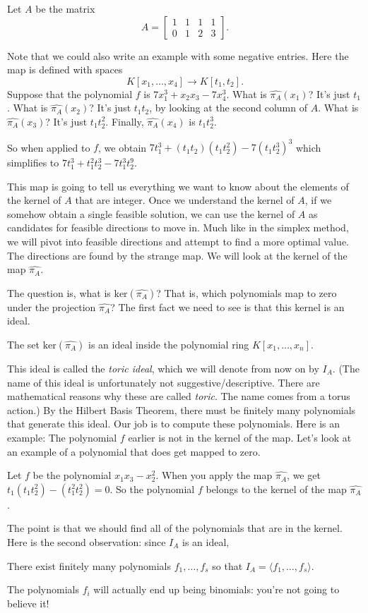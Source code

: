 \begin{example}
Let $A$ be the matrix
\[ A = \left[
\begin{array}{cccc}
1 & 1& 1& 1\\ 0 & 1& 2& 3
\end{array}
\right].\]

Note that we could also write an example with some negative entries. Here the map is defined with spaces
\[ K[x_1,\ldots,x_4] \rightarrow K[t_1,t_2]. \]
Suppose that the polynomial $f$ is $7 x_1^3 + x_2 x_3 - 7 x_4^3$.
What is $\widehat{\pi_A}(x_1)$? It's just $t_1$.
What is $\widehat{\pi_A}(x_2)$? It's just $t_1t_2$, by looking at the second column of $A$.
What is $\widehat{\pi_A}(x_3)$? It's just $t_1t_2^2$.
Finally, $\widehat{\pi_A}(x_4)$ is $t_1t_2^3$.

So when applied to $f$, we obtain $7 t_1^3 + (t_1t_2)(t_1t_2^2) - 7(t_1t_2^3)^3$ which simplifies to $7 t_1^3 + t_1^2 t_2^3 - 7 t_1^3 t_2^9$.
\end{example}
This map is going to tell us everything we want to know about the elements of the kernel of $A$ that are integer. Once we understand the kernel of $A$, if we somehow obtain a single feasible solution, we can use the kernel of $A$ as candidates for feasible directions to move in.  Much like in the simplex method, we will pivot into feasible directions and attempt to find a more optimal value. The directions are found by the strange map. We will look at the kernel of the map $\widehat{\pi_A}$.

The question is, what is $\text{ker}(\widehat{\pi_A})$? That is, which polynomials map to zero under the projection $\widehat{\pi_A}$? The first fact we need to see is that this kernel is an ideal.
\begin{lemma}
The set $\text{ker}(\widehat{\pi_A})$ is an ideal inside the polynomial ring $K[x_1,\ldots,x_n]$.
\end{lemma}
This ideal is called the \textit{toric ideal}, which we will denote from now on by $I_A$. (The name of this ideal is unfortunately not suggestive/descriptive. There are mathematical reasons why these are called \emph{toric}. The name comes from a torus action.) By the Hilbert Basis Theorem, there must be finitely many polynomials that generate this ideal. Our job is to compute these polynomials. Here is an example: The polynomial $f$ earlier is not in the kernel of the map. Let's look at an example of a polynomial that does get mapped to zero.
\begin{example}
Let $f$ be the polynomial $x_1 x_3 - x_2^2$. When you apply the map $\widehat{\pi_A}$, we get $t_1(t_1 t_2^2) - (t_1^2 t_2^2) = 0$. So the polynomial $f$ belongs to the kernel of the map $\widehat{\pi_A}$.
\end{example}
The point is that we should find all of the polynomials that are in the kernel. Here is the second observation: since $I_A$ is an ideal,
\begin{lemma}
There exist finitely many polynomials $f_1, \ldots, f_s$ so that $I_A = \langle f_1,\ldots, f_s \rangle$.
\end{lemma}
The polynomials $f_i$ will actually end up being binomials: you're not going to believe it!

